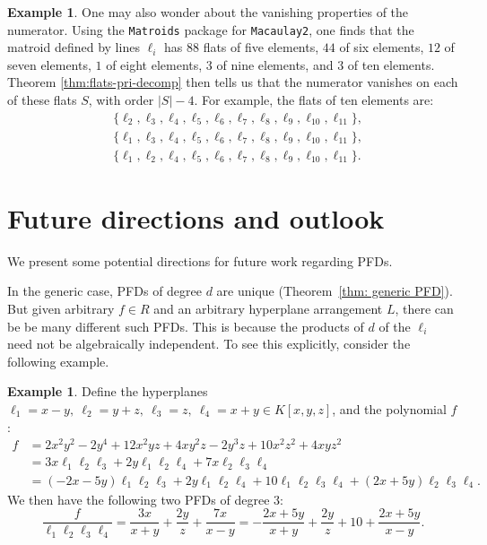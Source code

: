 \documentclass [a4paper,reqno, 11pt]{amsart}
\theoremstyle{plain}
\theoremstyle{plain}
\theoremstyle{plain}
\theoremstyle{plain}
\theoremstyle{definition}
\theoremstyle{definition}
\newtheorem{example}[theorem]{Example}
\theoremstyle{definition}
\theoremstyle{definition}
\theoremstyle{definition}
\theoremstyle{definition}
\begin{document}
\begin{example}
One may also wonder about the vanishing properties of the numerator. Using the \texttt{Matroids} package for \texttt{Macaulay2}, one finds that the matroid defined by lines $\ell_i$ has $88$ flats of five elements, $44$ of six elements, $12$ of seven elements, $1$ of eight elements, $3$ of nine elements, and $3$ of ten elements. Theorem \ref{thm:flats-pri-decomp} then tells us that the numerator vanishes on each of these flats $S$, with order $|S|-4$. For example, the flats of ten elements are:
\begin{equation*}
\begin{split}
    &\{\ell_{2},\ell_{3},\ell_{4},\ell_{5},\ell_{6},\ell_{7},\ell_{8},\ell_{9},\ell_{10},\ell_{11}\},\\
    &\{\ell_{1},\ell_{3},\ell_{4},\ell_{5},\ell_{6},\ell_{7},\ell_{8},\ell_{9},\ell_{10},\ell_{11}\},\\
    &\{\ell_{1},\ell_{2},\ell_{4},\ell_{5},\ell_{6},\ell_{7},\ell_{8},\ell_{9},\ell_{10},\ell_{11}\}.
\end{split}
\end{equation*}
\end{example}


\section{Future directions and outlook}\label{sec:future}

We present some potential directions for future work regarding PFDs.

In the generic case, PFDs of degree $d$ are unique (Theorem~\ref{thm: generic PFD}). But given arbitrary $f\in R$ and an arbitrary hyperplane arrangement $L$, there can be be many different such PFDs. This is because the products of $d$ of the $\ell_i$ need not be algebraically independent. To see this explicitly, consider the following example.
\begin{example}
Define the hyperplanes $\ell_1 = x-y, \ \ell_2=y+z, \ \ell_3=z, \ \ell_4=x+y\in K[x,y,z]$, and the polynomial $f$:
    \begin{align*}
        f &= 2x^2y^2-2y^4+12x^2yz+4xy^2z-2y^3z+10x^2z^2+4xyz^2\nonumber\\
        &=3x\ell_1\ell_2\ell_3+2y\ell_1\ell_2\ell_4+7x\ell_2\ell_3\ell_4\nonumber\\
        &=(-2x-5y)\ell_1\ell_2\ell_3+2y\ell_1\ell_2\ell_4+10\ell_1\ell_2\ell_3\ell_4+(2x+5y)\ell_2\ell_3\ell_4.
    \end{align*}
    We then have the following two PFDs of degree $3$:
    \begin{equation}\label{eqn:2pfd}
        \frac{f}{\ell_1\ell_2\ell_3\ell_4}=\frac{3x}{x+y}+\frac{2y}{z}+\frac{7x}{x-y}=-\frac{2x+5y}{x+y}+\frac{2y}{z}+10+\frac{2x+5y}{x-y}.
    \end{equation}
\end{example}
\end{document}
